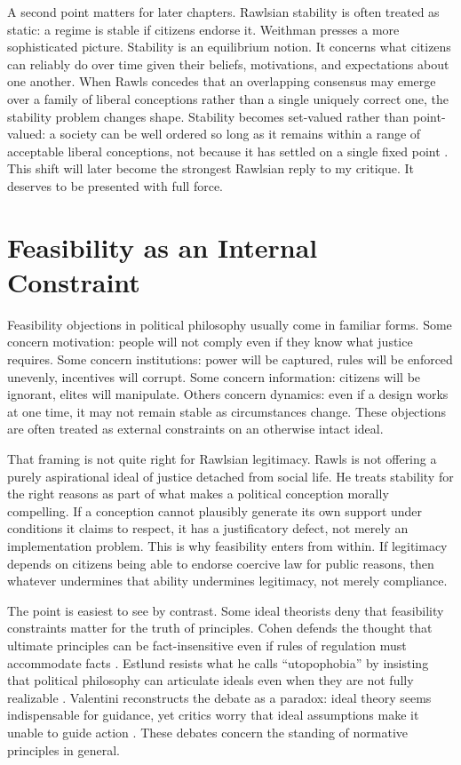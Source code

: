 \documentclass[12pt]{article}
\begin{document}
A second point matters for later chapters. Rawlsian stability is often treated as static: a regime is stable if citizens endorse it. Weithman presses a more sophisticated picture. Stability is an equilibrium notion. It concerns what citizens can reliably do over time given their beliefs, motivations, and expectations about one another. When Rawls concedes that an overlapping consensus may emerge over a family of liberal conceptions rather than a single uniquely correct one, the stability problem changes shape. Stability becomes set-valued rather than point-valued: a society can be well ordered so long as it remains within a range of acceptable liberal conceptions, not because it has settled on a single fixed point \parencite[pp.~205--206]{Weithman2023FixedPoints}. This shift will later become the strongest Rawlsian reply to my critique. It deserves to be presented with full force.

\section{Feasibility as an Internal Constraint}

Feasibility objections in political philosophy usually come in familiar forms. Some concern motivation: people will not comply even if they know what justice requires. Some concern institutions: power will be captured, rules will be enforced unevenly, incentives will corrupt. Some concern information: citizens will be ignorant, elites will manipulate. Others concern dynamics: even if a design works at one time, it may not remain stable as circumstances change. These objections are often treated as external constraints on an otherwise intact ideal.

That framing is not quite right for Rawlsian legitimacy. Rawls is not offering a purely aspirational ideal of justice detached from social life. He treats stability for the right reasons as part of what makes a political conception morally compelling. If a conception cannot plausibly generate its own support under conditions it claims to respect, it has a justificatory defect, not merely an implementation problem. This is why feasibility enters from within. If legitimacy depends on citizens being able to endorse coercive law for public reasons, then whatever undermines that ability undermines legitimacy, not merely compliance.

The point is easiest to see by contrast. Some ideal theorists deny that feasibility constraints matter for the truth of principles. Cohen defends the thought that ultimate principles can be fact-insensitive even if rules of regulation must accommodate facts \parencite[p.~20]{cohen2008rescuing}. Estlund resists what he calls \enquote{utopophobia} by insisting that political philosophy can articulate ideals even when they are not fully realizable \parencite[p.~4]{estlund2019utopophobia}. Valentini reconstructs the debate as a paradox: ideal theory seems indispensable for guidance, yet critics worry that ideal assumptions make it unable to guide action \parencite[p.~332]{valentini2009paradox}. These debates concern the standing of normative principles in general.
\end{document}
